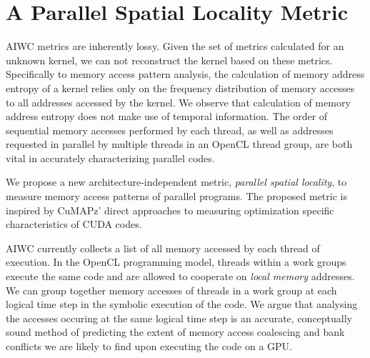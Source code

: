 \documentclass[review=false, sigchi]{acmart}
\begin{document}
	\section{A Parallel Spatial Locality Metric} \label{discussion}
	
	AIWC metrics are inherently lossy. Given the set of metrics calculated for an unknown kernel, we can not reconstruct the kernel based on these metrics. Specifically to memory access pattern analysis, the calculation of memory address entropy of a kernel relies only on the frequency distribution of memory accesses to all addresses accessed by the kernel. We observe that calculation of memory address entropy does not make use of temporal information. The order of sequential memory accesses performed by each thread, as well as addresses requested in parallel by multiple threads in an OpenCL thread group, are both vital in accurately characterizing parallel codes.
	
	We propose a new architecture-independent metric, \emph{parallel spatial locality}, to measure memory access patterns of parallel programs.
	The proposed metric is inspired by CuMAPz' direct approaches to measuring optimization specific characteristics of CUDA codes.
	
	AIWC currently collects a list of all memory accessed by each thread of execution.
	In the OpenCL programming model, threads within a work groups execute the same code and are allowed to cooperate on \textit{local memory} addresses.
	We can group together memory accesses of threads in a work group at each logical time step in the symbolic execution of the code.
	We argue that analysing the accesses occuring at the same logical time step is an accurate, conceptually sound method of predicting the extent of memory access coalescing and bank conflicts we are likely to find upon executing the code on a GPU.
	
\end{document}
